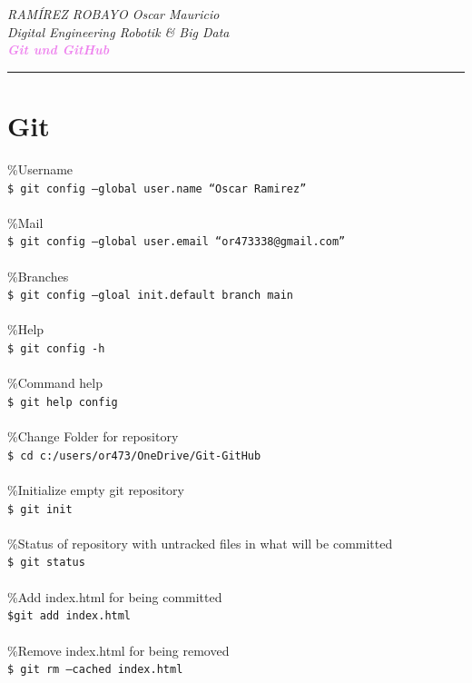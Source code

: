 \documentclass[10pt, a4paper,ngerman]{article}
\let\oldtextbf\textbf
\renewcommand{\textbf}[1]{\textcolor{violet}{\oldtextbf{#1}}}
\begin{document}
\thispagestyle{empty}

\begin{flushleft}
  \textit{RAMÍREZ ROBAYO Oscar Mauricio}
  \\
  \textit{Digital Engineering Robotik \& Big Data}
  \\
  \textcolor{blue}{\textbf{\textit{Git und GitHub}}}
  \\
  \textcolor{violet}{{\rule{\paperwidth/2}{0.1pt}}}
\end{flushleft}
\section{Git}
\%Username\\
\texttt{\$ git config --global user.name ``Oscar Ramirez''}\\\\
\%Mail\\
\texttt{\$ git config --global user.email ``or473338@gmail.com''}\\\\
\%Branches\\
\texttt{\$ git config --gloal init.default branch main}\\\\
\%Help \\
\texttt{\$ git config -h}\\\\
\%Command help\\
\texttt{\$ git help config}\\\\
\%Change Folder for repository\\
\texttt{\$ cd c:/users/or473/OneDrive/Git-GitHub}\\\\
\%Initialize empty git repository\\
\texttt{\$ git init}\\\\
\%Status of repository with untracked files in what will be committed\\
\texttt{\$ git status}\\\\
\%Add index.html for being committed\\
\texttt{\$git add index.html}\\\\
\%Remove index.html for being removed\\
\texttt{\$ git rm --cached index.html}\\\\
\end{document}
